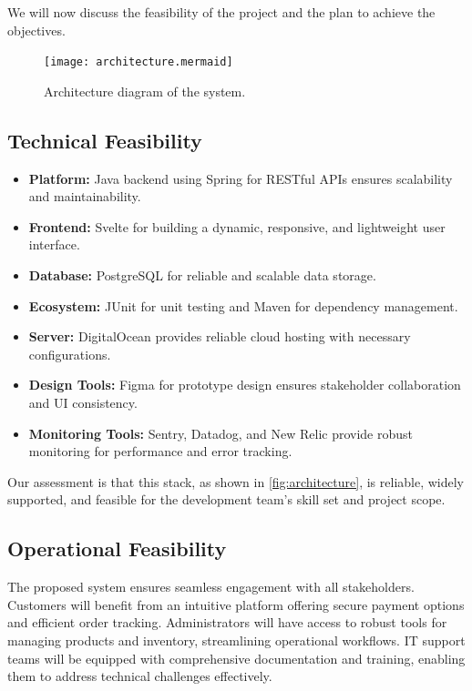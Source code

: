 \documentclass[twoside,a4paper,journal]{IEEEtran}
\begin{document}
We will now discuss the feasibility of the project and the plan to achieve the
objectives.

\begin{figure}[!t]
\centering
\texttt{[image: architecture.mermaid]}
\caption{Architecture diagram of the system.}
\label{fig:architecture}
\end{figure}

\subsection{Technical Feasibility}
\begin{itemize}
  \item \textbf{Platform:} Java backend using Spring for RESTful APIs
    ensures scalability and maintainability.
  \item \textbf{Frontend:} Svelte for building a dynamic, responsive, and
    lightweight user interface.
  \item \textbf{Database:} PostgreSQL for reliable and scalable data storage.
  \item \textbf{Ecosystem:} JUnit for unit testing and Maven for dependency
    management.
  \item \textbf{Server:} DigitalOcean provides reliable cloud hosting with
    necessary configurations.
  \item \textbf{Design Tools:} Figma for prototype design ensures stakeholder
    collaboration and UI consistency.
  \item \textbf{Monitoring Tools:} Sentry, Datadog, and New Relic provide robust
    monitoring for performance and error tracking.
\end{itemize}

Our assessment is that this stack,
as shown in \autoref{fig:architecture},
is reliable, widely supported, and feasible
for the development team's skill set and project scope.

\subsection{Operational Feasibility}
The proposed system ensures seamless engagement with all stakeholders.
Customers will benefit from an intuitive platform offering secure payment
options and efficient order tracking.
Administrators will have access to robust tools for managing products and
inventory, streamlining operational workflows.
IT support teams will be equipped with comprehensive documentation and training,
enabling them to address technical challenges effectively.
\end{document}
